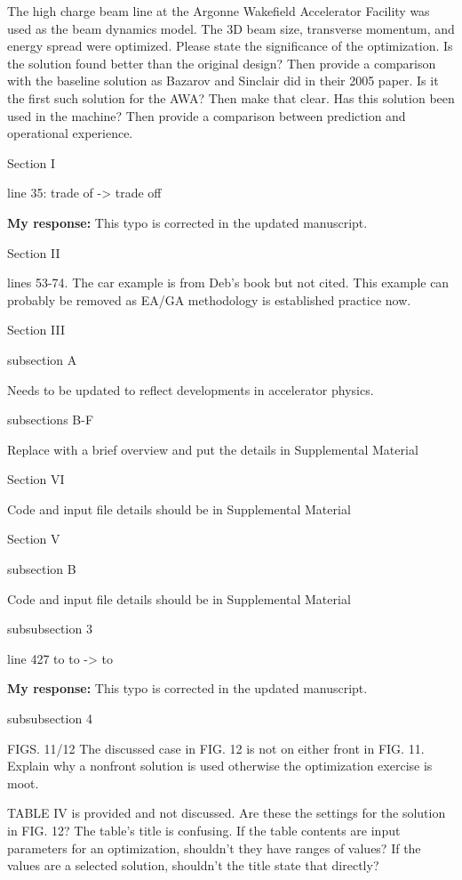 \documentclass{article}
\begin{document}
The high charge beam line at the Argonne Wakefield Accelerator
Facility was used as the beam dynamics model. The 3D beam size,
transverse momentum, and energy spread were optimized. Please state
the significance of the optimization. Is the solution found better
than the original design? Then provide a comparison with the baseline
solution as Bazarov and Sinclair did in their 2005 paper. Is it the
first such solution for the AWA? Then make that clear. Has this
solution been used in the machine? Then provide a comparison between
prediction and operational experience.

Section I

line 35: trade of -> trade off

{\bf My response:} {\color{blue} This typo is corrected in the updated manuscript.}

Section II

lines 53-74. The car example is from Deb’s book but not cited. This
example can probably be removed as EA/GA methodology is established
practice now.

Section III

subsection A

Needs to be updated to reflect developments in accelerator physics.

subsections B-F

Replace with a brief overview and put the details in Supplemental
Material

Section VI

Code and input file details should be in Supplemental Material

Section V

subsection B

Code and input file details should be in Supplemental Material

subsubsection 3

line 427 to to -> to

{\bf My response:} {\color{blue} This typo is corrected in the updated manuscript.}

subsubsection 4

FIGS. 11/12 The discussed case in FIG. 12 is not on either front in
FIG. 11. Explain why a nonfront solution is used otherwise the
optimization exercise is moot.

TABLE IV is provided and not discussed. Are these the settings for the
solution in FIG. 12? The table’s title is confusing. If the table
contents are input parameters for an optimization, shouldn’t they have
ranges of values? If the values are a selected solution, shouldn’t the
title state that directly?




 
\end{document}

